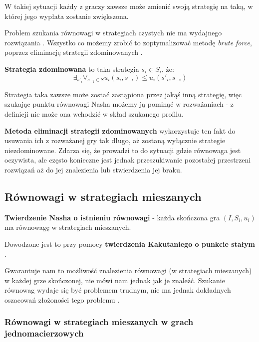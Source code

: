 \documentclass[polish]{standalone}
\begin{document}
W takiej sytuacji każdy z graczy zawsze może zmienić swoją strategię na taką, w której jego wypłata zostanie zwiększona.

Problem szukania równowagi w strategiach czystych nie ma wydajnego rozwiązania \cite[str.~16]{FT-GT}. Wszystko co
możemy zrobić to zoptymalizować metodę \textit{brute force}, poprzez eliminację strategii zdominowanych
\cite[str.~9--11]{FT-GT}.

\begin{definition}
\textbf{Strategia zdominowana} to taka strategia $s_i \in S_i$, że:
$$\exists_{s'_i} \forall_{s_{-1} \in S} u_i(s_i, s_{-i}) \leq u_i(s'_i, s_{-i})$$
\cite[str.~6--7]{FT-GT}
\end{definition}

Strategia taka zawsze może zostać zastąpiona przez jakąś inną strategię, więc szukając punktu równowagi Nasha możemy ją
pominąć w rozważaniach - z definicji nie może ona wchodzić w skład szukanego profilu.

\textbf{Metoda eliminacji strategii zdominowanych} wykorzystuje ten fakt do usuwania ich z rozważanej gry tak długo, aż
zostaną wyłącznie strategie niezdominowane. Zdarza się, że prowadzi to do sytuacji gdzie równowaga jest oczywista, ale
często konieczne jest jednak przeszukiwanie pozostałej przestrzeni rozwiązań aż do jej znalezienia lub stwierdzenia jej
braku.

\subsection{Równowagi w strategiach mieszanych}

\begin{theorem}
\textbf{Twierdzenie Nasha o istnieniu równowagi} - każda skończona gra $(I, S_i, u_i)$ ma równowagę w strategiach
mieszanych.
\cite[str.~29]{FT-GT}
\end{theorem}

Dowodzone jest to przy pomocy \textbf{twierdzenia Kakutaniego o punkcie stałym} \cite[str.~29]{FT-GT}.

Gwarantuje nam to możliwość znalezienia równowagi (w strategiach mieszanych) w każdej grze skończonej, nie mówi nam
jednak jak je znaleźć. Szukanie równowag wydaje się być problemem trudnym, nie ma jednak dokładnych oszacowań złożoności
tego problemu \cite{P-AGI}.

\subsubsection{Równowagi w strategiach mieszanych w grach jednomacierzowych}
\end{document}
